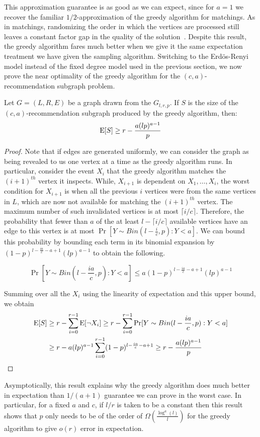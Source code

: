 This approximation guarantee is as good as we can expect, since for $a=1$ we recover the familiar
$1/2$-approximation of the greedy algorithm for matchings.
As in matchings, randomizing the order in
which the vertices are processed still leaves a constant factor gap
in the quality of the solution~\cite{KarpVaziraniVazirani1990}.
Despite this result, the greedy algorithm fares much better when we
give it the same expectation treatment we have given the sampling
algorithm. Switching to the Erd\"{o}s-Renyi model instead of the
fixed degree model used in the previous section, we now prove the
near optimality of the greedy algorithm for the $(c, a)$-recommendation
subgraph problem.

{
\renewcommand{\qedsymbol}{}
\begin{thm}
Let $G=(L,R,E)$ be a graph drawn from the $G_{l,r,p}$. If $S$ is the size of the $(c,a)$-recommendation subgraph produced by the greedy algorithm, then:
\[ \text{E}[S] \geq r - \frac{a(lp)^{a-1}}{p}\]
\end{thm}
\begin{proof}
Note that if edges are generated uniformly, we can consider the
graph as being revealed to us one vertex at a time as the greedy
algorithm runs. In particular, consider the event $X_i$ that the
greedy algorithm matches the $(i+1)^{th}$ vertex it inspects. While,
$X_{i+1}$ is dependent on $X_1,\ldots, X_i$, the worst condition for
$X_{i+1}$ is when all the previous $i$ vertices were from the same
vertices in $L$, which are now not available for matching the
$(i+1)^{th}$ vertex. The maximum number of such invalidated vertices
is at most $\lceil i/c \rceil$. Therefore, the probability that fewer
than $a$ of the at least $l-\lceil i/c \rceil $ available
vertices have an edge to this vertex is at most $\Pr[Y\sim Bin(l-\frac{i}{c},p): Y < a]$.
We can bound this probability by bounding each term in its binomial
expansion by $(1-p)^{l-\frac{ia}{c}-a+1}(lp)^{a-1}$ to obtain the following.

\[ \Pr[Y\sim Bin(l-\frac{ia}{c},p): Y < a] \leq a (1-p)^{l-\frac{ia}{c}-a+1}(lp)^{a-1}\]

Summing over all the $X_i$ using the linearity of expectation and this upper bound,
we obtain
\begin{align*}
      \text{E}[S]
&\geq r - \sum_{i=0}^{r-1} \text{E}[\lnot X_i] \geq r - \sum_{i=0}^{r-1} \Pr[Y \sim Bin(l-\frac{ia}{c},p): Y < a] \\
&\geq r - a(lp)^{a-1}\sum_{i=0}^{r-1}(1-p)^{l-\frac{ia}{c}-a+1} \geq r - \frac{a(lp)^{a-1}}{p}
\end{align*}
\end{proof}
}

Asymptotically, this result explains why the greedy
algorithm does much better in expectation than $1/(a+1)$ guarantee we
can prove in the worst case. In particular, for a fixed $a$ and $c$, if
$l/r$ is taken to be a constant then this result shows that $p$ only
needs to be of the order of $\Omega(\frac{\log^{a}(l)}{l})$ for the greedy algorithm to
give $o(r)$ error in expectation.
